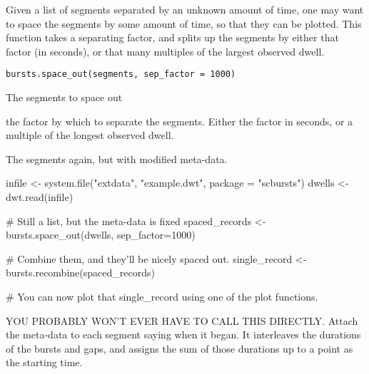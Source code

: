 \documentclass[letterpaper]{book}
\begin{document}
%
\begin{Description}\relax
Given a list of segments separated by an unknown amount of time, one may want to space the segments by some amount of time, so that they can be plotted. This function takes a separating factor, and splits up the segments by either that factor (in seconds), or that many multiples of the largest observed dwell.
\end{Description}
%
\begin{Usage}
\begin{verbatim}
bursts.space_out(segments, sep_factor = 1000)
\end{verbatim}
\end{Usage}
%
\begin{Arguments}
\begin{ldescription}
\item[\code{segments}] The segments to space out

\item[\code{sep\_factor}] the factor by which to separate the segments.
Either the factor in seconds, or a multiple of the longest observed dwell.
\end{ldescription}
\end{Arguments}
%
\begin{Value}
The segments again, but with modified meta-data.
\end{Value}
%
\begin{Examples}
\begin{ExampleCode}
infile <- system.file("extdata", "example.dwt", package = "scbursts")
dwells <- dwt.read(infile)

# Still a list, but the meta-data is fixed
spaced_records <- bursts.space_out(dwells, sep_factor=1000)

# Combine them, and they'll be nicely spaced out.
single_record <- bursts.recombine(spaced_records)

# You can now plot that single_record using one of the plot functions.

\end{ExampleCode}
\end{Examples}
%
\begin{Description}\relax
YOU PROBABLY WON'T EVER HAVE TO CALL THIS DIRECTLY. Attach the meta-data to each segment saying when it began. It interleaves the durations of the bursts and gaps, and assigns the sum of those durations up to a point as the starting time.
\end{Description}
\end{document}
